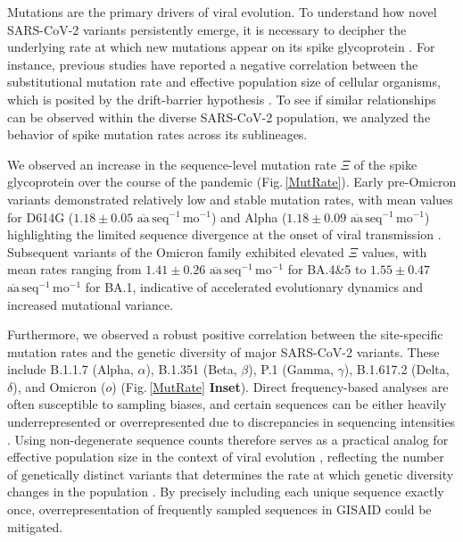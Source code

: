 \documentclass[%
 reprint,
superscriptaddress,
 amsmath,amssymb,
 aps,
]{revtex4-2}
\begin{document}
Mutations are the primary drivers of viral evolution. To understand how novel SARS-CoV-2 variants persistently emerge, it is necessary to decipher the underlying rate at which new mutations appear on its spike glycoprotein \cite{10.1038/s41579-023-00878-2}. For instance, previous studies have reported a negative correlation between the substitutional mutation rate and effective population size of cellular organisms, which is posited by the drift-barrier hypothesis \cite{LYNCH2010345, Lynch2016}. To see if similar relationships can be observed within the diverse SARS-CoV-2 population, we analyzed the behavior of spike mutation rates across its sublineages.

We observed an increase in the sequence-level mutation rate $\Xi$ of the spike glycoprotein over the course of the pandemic (Fig.\,\ref{MutRate}). Early pre-Omicron variants demonstrated relatively low and stable mutation rates, with mean values for D614G ($1.18 \pm 0.05$ $\overline{\text{aa}}\, \text{seq}^{-1}\, \text{mo}^{-1}$) and Alpha ($1.18 \pm 0.09$ $\overline{\text{aa}}\, \text{seq}^{-1}\, \text{mo}^{-1}$) highlighting the limited sequence divergence at the onset of viral transmission \cite{10.1093/ve/veaa061}. Subsequent variants of the Omicron family exhibited elevated $\Xi$ values, with mean rates ranging from $1.41 \pm 0.26$ $\overline{\text{aa}}\, \text{seq}^{-1}\, \text{mo}^{-1}$ for BA.4\&5 to $1.55 \pm 0.47$ $\overline{\text{aa}}\, \text{seq}^{-1}\, \text{mo}^{-1}$ for BA.1, indicative of accelerated evolutionary dynamics and increased mutational variance.

Furthermore, we observed a robust positive correlation between the site-specific mutation rates and the genetic diversity of major SARS-CoV-2 variants. These include B.1.1.7 (Alpha, $\alpha$), B.1.351 (Beta, $\beta$), P.1 (Gamma, $\gamma$), B.1.617.2 (Delta, $\delta$), and Omicron ($o$) (Fig.\,\ref{MutRate} \textbf{Inset}). Direct frequency-based analyses are often susceptible to sampling biases, and certain sequences can be either heavily underrepresented or overrepresented due to discrepancies in sequencing intensities \cite{bias1, bias2}. Using non-degenerate sequence counts therefore serves as a practical analog for effective population size in the context of viral evolution \cite{Wilke2005, 10.1371/journal.pgen.1008271}, reflecting the number of genetically distinct variants that determines the rate at which genetic diversity changes in the population \cite{10.1093/jhered/esac023, https://doi.org/10.1111/mec.17670}. By precisely including each unique sequence exactly once, overrepresentation of frequently sampled sequences in GISAID could be mitigated.
\end{document}
